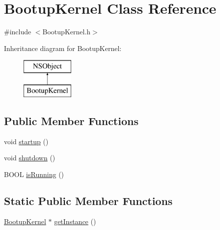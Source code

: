 \hypertarget{interface_bootup_kernel}{
\section{\-Bootup\-Kernel \-Class \-Reference}
\label{interface_bootup_kernel}
}


{\ttfamily \#include $<$\-Bootup\-Kernel.\-h$>$}

\-Inheritance diagram for \-Bootup\-Kernel\-:\begin{figure}[H]
\begin{center}
\leavevmode
\includegraphics[height=2.000000cm]{interface_bootup_kernel}
\end{center}
\end{figure}
\subsection*{\-Public \-Member \-Functions}
\begin{DoxyCompactItemize}
\item 
void \hyperlink{interface_bootup_kernel_afe6589ba940f1a038de993e8b8e2f63c}{startup} ()
\item 
void \hyperlink{interface_bootup_kernel_a4065ac31dfc583c023e6035949b194ff}{shutdown} ()
\item 
\-B\-O\-O\-L \hyperlink{interface_bootup_kernel_af740a50332c1cb2038890072d2ba6b8c}{is\-Running} ()
\end{DoxyCompactItemize}
\subsection*{\-Static \-Public \-Member \-Functions}
\begin{DoxyCompactItemize}
\item 
\hyperlink{interface_bootup_kernel}{\-Bootup\-Kernel} $\ast$ \hyperlink{interface_bootup_kernel_a6fa0afa811f224e2a7b7687012025579}{get\-Instance} ()
\end{DoxyCompactItemize}


